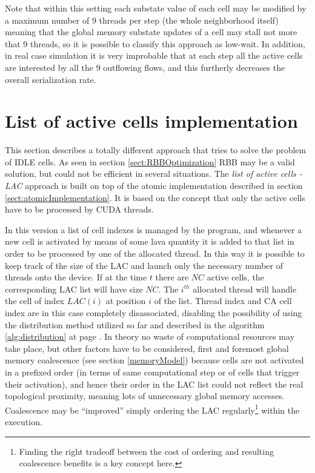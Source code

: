 Note that within this setting each substate value of each cell may be modified
by a maximum number of 9 threads per step (the whole neighborhood itself) meaning
that the global memory substate updates of a cell may stall not more
that 9 threads, so it is possible to classify this approach as low-wait.
In addition, in real case simulation it is very improbable that at each step
all the active cells are interested by all the 9 outflowing flows, and this
furtherly decreases the overall serialization rate.




\section{List of active cells implementation}\label{sect:linearCellAtomic}
This section describes a totally different approach that tries to solve the
problem of IDLE cells. As seen in section \ref{sect:RBBOptimization} RBB may
be a valid solution, but could not be efficient in several situations. The
\textit{list of active cells - LAC} approach is built on top of the atomic
implementation described in section \ref{sect:atomicImplementation}. It is
based on the concept that only the active cells have to be processed by CUDA
threads.

In this version a list of cell indexes is managed by the program, and whenever a
new cell is activated by means of some lava quantity it is added to that list in
order to be processed by one of the allocated thread.
In this way it is possible to keep track of the size of the LAC and launch only
the necessary number of threads onto the device.  If at the time \(t\) there are
\(NC\) active cells, the corresponding LAC list will have size \(NC\). The
\(i^{th}\) allocated thread will handle the cell of index \(LAC(i)\) at position
\(i\) of the list. Thread index and CA cell index are in this case completely
disassociated, disabling the possibility of using the distribution method
utilized so far and described in the algorithm \ref{alg:distribution} at page
\pageref{alg:distribution}.
 In theory no waste of computational resources may take place, but other factors
 have to be considered, first and foremost global memory coalescence (see
 section \ref{memoryModel}) because cells are not activated in a prefixed order
 (in terms of same computational step or of cells that trigger their
 activation), and hence their order in the LAC list could not reflect the real
 topological proximity, meaning lots of unnecessary global memory
 accesses.
 Coalescence may be ``improved'' simply ordering the LAC
 regularly\footnote{Finding the right tradeoff between the cost of ordering and
 resulting coalescence benefits is a key concept here.} within the execution.
 
